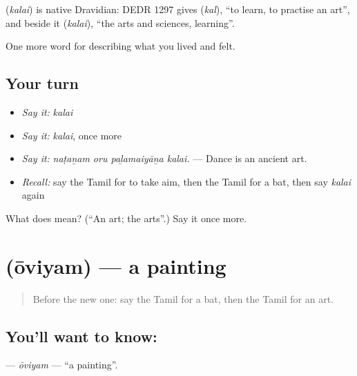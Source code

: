 \begin{cousinweb}
\textbf{} (\emph{kalai}) is native Dravidian: DEDR 1297 gives  (\emph{kal}), \textquotedblleft{}to learn, to practise an art\textquotedblright{}, and beside it  (\emph{kalai}), \textquotedblleft{}the arts and sciences, learning\textquotedblright{}.
\end{cousinweb}

\begin{grammarlens}[title={What you've built}]
One more word for describing what you lived and felt.
\end{grammarlens}

\subsection*{Your turn}
\begin{itemize}
\raggedright
  \item \emph{Say it:} \emph{kalai}
  \item \emph{Say it:} \emph{kalai}, once more
  \item \emph{Say it:} \emph{naṭaṉam oru paḻamaiyāṉa kalai.} — Dance is an ancient art.
  \item \emph{Recall:} say the Tamil for to take aim, then the Tamil for a bat, then say \emph{kalai} again
\end{itemize}

\begin{tcolorbox}[breakable,colback=teal!4,colframe=teal!35!black,title={Before you move on}]
What does  mean? (\textquotedblleft{}An art; the arts\textquotedblright{}.) Say it once more.
\end{tcolorbox}
\section[\texorpdfstring{\ta{ஓவியம்} (ōviyam)}{ஓவியம் (ōviyam)}]{ (ōviyam) — a painting}

\label{lesson:TA-C536-oviyam}



\begin{quote}
Before the new one: say the Tamil for a bat, then the Tamil for an art.
\end{quote}

\subsection*{You'll want to know: }
\textbf{} — \emph{ōviyam} — \textquotedblleft{}a painting\textquotedblright{}.

